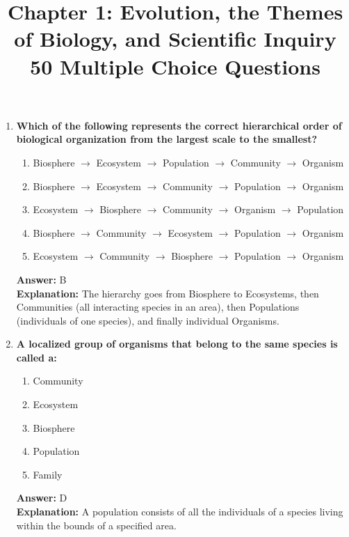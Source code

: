 \documentclass[11pt, a4paper]{article}
\title{\textbf{Chapter 1: Evolution, the Themes of Biology, and Scientific Inquiry \\ 50 Multiple Choice Questions}}
\author{}
\date{}
\begin{document}
\maketitle

\begin{enumerate}

\item \textbf{Which of the following represents the correct hierarchical order of biological organization from the largest scale to the smallest?}
\begin{enumerate}[label=\Alph*.]
    \item Biosphere $\rightarrow$ Ecosystem $\rightarrow$ Population $\rightarrow$ Community $\rightarrow$ Organism
    \item Biosphere $\rightarrow$ Ecosystem $\rightarrow$ Community $\rightarrow$ Population $\rightarrow$ Organism
    \item Ecosystem $\rightarrow$ Biosphere $\rightarrow$ Community $\rightarrow$ Organism $\rightarrow$ Population
    \item Biosphere $\rightarrow$ Community $\rightarrow$ Ecosystem $\rightarrow$ Population $\rightarrow$ Organism
    \item Ecosystem $\rightarrow$ Community $\rightarrow$ Biosphere $\rightarrow$ Population $\rightarrow$ Organism
\end{enumerate}
\textbf{Answer:} B \\
\textbf{Explanation:} The hierarchy goes from Biosphere to Ecosystems, then Communities (all interacting species in an area), then Populations (individuals of one species), and finally individual Organisms.

\item \textbf{A localized group of organisms that belong to the same species is called a:}
\begin{enumerate}[label=\Alph*.]
    \item Community
    \item Ecosystem
    \item Biosphere
    \item Population
    \item Family
\end{enumerate}
\textbf{Answer:} D \\
\textbf{Explanation:} A population consists of all the individuals of a species living within the bounds of a specified area.


\end{enumerate}
\end{document}
